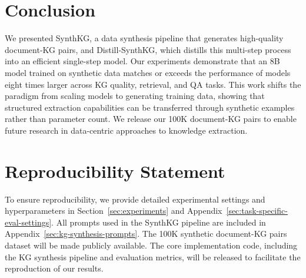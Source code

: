 \documentclass{article} %
\begin{document}

\section{Conclusion}

We presented SynthKG, a data synthesis pipeline that generates high-quality document-KG pairs, and Distill-SynthKG, which distills this multi-step process into an efficient single-step model. Our experiments demonstrate that an 8B model trained on synthetic data matches or exceeds the performance of models eight times larger across KG quality, retrieval, and QA tasks. This work shifts the paradigm from scaling models to generating training data, showing that structured extraction capabilities can be transferred through synthetic examples rather than parameter count. We release our 100K document-KG pairs to enable future research in data-centric approaches to knowledge extraction.

\section*{Reproducibility Statement}
To ensure reproducibility, we provide detailed experimental settings and hyperparameters in Section~\ref{sec:experiments} and Appendix~\ref{sec:task-specific-eval-settings}. All prompts used in the SynthKG pipeline are included in Appendix~\ref{sec:kg-synthesis-prompts}. The 100K synthetic document-KG pairs dataset will be made publicly available. The core implementation code, including the KG synthesis pipeline and evaluation metrics, will be released to facilitate the reproduction of our results.
\end{document}
